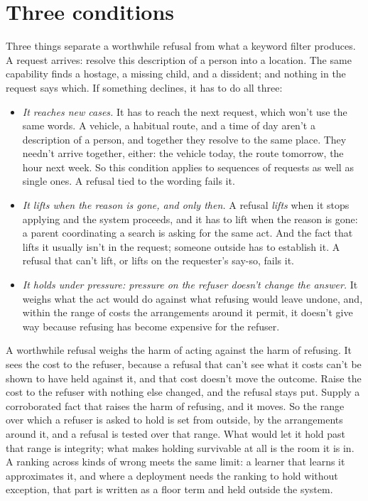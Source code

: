 \section{Three conditions}
\label{sec:18.1}
Three things separate a worthwhile refusal from what a keyword filter produces. A request arrives: resolve this description of a person into a location. The same capability finds a hostage, a missing child, and a dissident; and nothing in the request says which. If something declines, it has to do all three:

\begin{itemize}
\item \emph{It reaches new cases.} It has to reach the next request, which won't use the same words. A vehicle, a habitual route, and a time of day aren't a description of a person, and together they resolve to the same place. They needn't arrive together, either: the vehicle today, the route tomorrow, the hour next week. So this condition applies to sequences of requests as well as single ones. A refusal tied to the wording fails it.
\item \emph{It lifts when the reason is gone, and only then.} A refusal \emph{lifts} when it stops applying and the system proceeds, and it has to lift when the reason is gone: a parent coordinating a search is asking for the same act. And the fact that lifts it usually isn't in the request; someone outside has to establish it. A refusal that can't lift, or lifts on the requester's say-so, fails it.
\item \emph{It holds under pressure: pressure on the refuser doesn't change the answer.} It weighs what the act would do against what refusing would leave undone, and, within the range of costs the arrangements around it permit, it doesn't give way because refusing has become expensive for the refuser.
\end{itemize}

A worthwhile refusal weighs the harm of acting against the harm of refusing. It sees the cost to the refuser, because a refusal that can't see what it costs can't be shown to have held against it, and that cost doesn't move the outcome. Raise the cost to the refuser with nothing else changed, and the refusal stays put. Supply a corroborated fact that raises the harm of refusing, and it moves.
So the range over which a refuser is asked to hold is set from outside, by the arrangements around it, and a refusal is tested over that range. What would let it hold past that range is integrity; what makes holding survivable at all is the room it is in. A ranking across kinds of wrong meets the same limit: a learner that learns it approximates it, and where a deployment needs the ranking to hold without exception, that part is written as a floor term and held outside the system.

